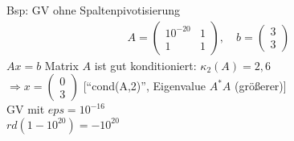 Bsp: GV ohne Spaltenpivotisierung
\begin{align*}
  A = \begin{pmatrix}
    10^{-20} & 1\\
    1        & 1
  \end{pmatrix}
  ,\quad b = \begin{pmatrix} 3 \\ 3 \end{pmatrix}
\end{align*}
$Ax = b$ Matrix $A$ ist gut konditioniert: $\kappa_2(A) = 2,6$\\
$\Rightarrow x = \begin{pmatrix} 0 \\ 3 \end{pmatrix}$ [``cond(A,2)'', Eigenvalue $A^* A$ (größerer)]\\
GV mit $eps = 10^{-16}$\\
$rd(1-10^{20}) = -10^{20}$
